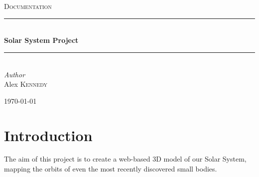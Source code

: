 \documentclass[11pt]{article}
\begin{document}
\begin{titlepage}
	\newcommand{\HRule}{\rule{\linewidth}{0.5mm}} %

	\center


	\textsc{\LARGE}\\[1.5cm] %

	\textsc{\Large }\\[0.5cm] %

	\textsc{\large Documentation}\\[0.5cm] %


	\HRule\\[0.4cm]

	{\huge\bfseries Solar System Project}\\[0.4cm] %

	\HRule\\[1.5cm]


	{\large\textit{Author}}\\
	Alex \textsc{Kennedy} %


	\vfill\vfill\vfill %

	{\large\today} %


	\vfill %

\end{titlepage}

\tableofcontents

\pagebreak

\section{Introduction}
The aim of this project is to create a web-based 3D model of our Solar System, mapping the orbits of even the most recently discovered small bodies. 
\end{document}

